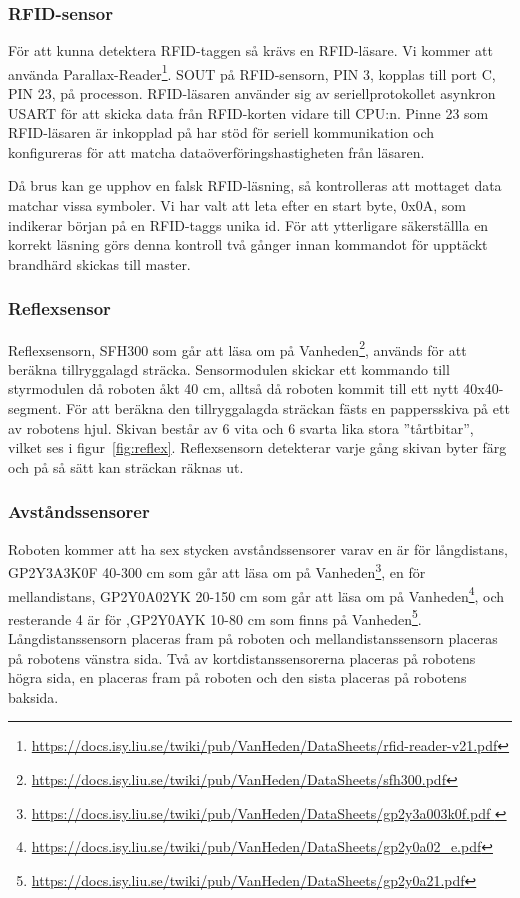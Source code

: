 \documentclass[a4paper,12pt,fleqn]{article}
\begin{document}
\subsubsection{RFID-sensor}
För att kunna detektera RFID-taggen så krävs en RFID-läsare. Vi kommer att använda Par\-all\-ax-Read\-er\footnote{\url{https://docs.isy.liu.se/twiki/pub/VanHeden/DataSheets/rfid-reader-v21.pdf}}. 
SOUT på RFID-sensorn, PIN 3, kopplas till port C, PIN 23, på processon. RFID-läsaren använder sig av seriellprotokollet asynkron USART för att skicka data från RFID-korten vidare till CPU:n. Pinne 23 som RFID-läsaren är inkopplad på har stöd för seriell kommunikation och konfigureras för att matcha dataöverföringshastigheten från läsaren.

Då brus kan ge upphov en falsk RFID-läsning, så kontrolleras att mottaget data matchar vissa symboler. Vi har valt att leta efter en start byte, 0x0A, som indikerar början på en RFID-taggs unika id. För att ytterligare säkerställla en korrekt läsning görs denna kontroll två gånger innan kommandot för upptäckt brandhärd skickas till master.

\subsubsection{Reflexsensor}
Reflexsensorn, SFH300 som går att läsa om på Vanheden\footnote{\url{https://docs.isy.liu.se/twiki/pub/VanHeden/DataSheets/sfh300.pdf}}, används för att beräkna tillryggalagd sträcka. Sensormodulen skickar ett kommando till styrmodulen då roboten åkt 40 cm, alltså då roboten kommit till ett nytt 40x40-segment. För att beräkna den tillryggalagda sträckan fästs en pappersskiva på ett av robotens hjul. Skivan består av 6 vita och 6 svarta lika stora ''tårtbitar'', vilket ses i figur~\ref{fig:reflex}. Reflexsensorn detekterar varje gång skivan byter färg och på så sätt kan sträckan räknas ut.

\subsubsection{Avståndssensorer}
Roboten kommer att ha sex stycken av\-stånds\-sensorer varav en är för lång\-distans, GP\-2Y3A\-3K\-0F 40-300 cm som går att läsa om på Vanheden\footnote{\url{ https://docs.isy.liu.se/twiki/pub/VanHeden/DataSheets/gp2y3a003k0f.pdf }}, en för mellan\-distans, GP2Y0A02YK 20-150 cm som går att läsa om på Vanheden\footnote{\url{https://docs.isy.liu.se/twiki/pub/VanHeden/DataSheets/gp2y0a02_e.pdf}}, och resterande 4 är för ,GP\-2Y\-0A\-YK 10-80 cm som finns på Vanheden\footnote{\url{https://docs.isy.liu.se/twiki/pub/VanHeden/DataSheets/gp2y0a21.pdf}}. Långdistanssensorn placeras fram på roboten och mellandistanssensorn placeras på robotens vänstra sida. Två av kortdistanssensorerna placeras på robotens högra sida, en placeras fram på roboten och den sista placeras på robotens baksida.
\end{document}
